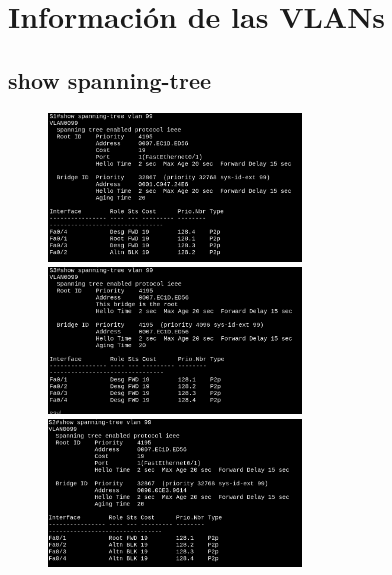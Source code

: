 \documentclass[letterpaper,12pt]{article}
\begin{document}
\begin{sloppypar}
\section{Información de las VLANs}
\subsection{show spanning-tree}
\begin{figure}[H]
    \centering 
    \includegraphics[width=0.6\textwidth]{spaningtre1.png}
    \vspace{0.3cm}\\ 
    \includegraphics[width=0.6\textwidth]{spa2.png}
    \vspace{0.3cm}\\ 
    \includegraphics[width=0.6\textwidth]{s2spa.png}
\end{figure}

\end{sloppypar}
\end{document}
